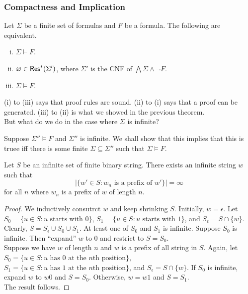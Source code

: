 \subsubsection{Compactness and Implication}

Let $\Sigma$ be a finite set of formulas and $F$ be a formula. The following are equivalent.
\begin{enumerate}[(i)]
	\item $\Sigma\vdash F$.
	\item $\varnothing\in\mathsf{Res}^*(\Sigma')$, where $\Sigma'$ is the CNF of $\bigwedge\Sigma\land\neg F$.
	\item $\Sigma\vDash F$.
\end{enumerate}

(i) to (iii) says that proof rules are sound. (ii) to (i) says that a proof can be generated. (iii) to (ii) is what we showed in the previous theorem.\\

But what do we do in the case where $\Sigma$ is infinite?

Suppose $\Sigma''\vDash F$ and $\Sigma''$ is infinite. We shall show that this implies that this is truee iff there is some finite $\Sigma\subseteq\Sigma''$ such that $\Sigma\vDash F$.\\

\begin{theorem}
	Let $S$ be an infinite set of finite binary string. There exists an infinite string $w$ such that
	\[ |\{w'\in S : w_n \text{ is a prefix of }w'\}|=\infty \]
	for all $n$ where $w_n$ is a prefix of $w$ of length $n$.
\end{theorem}
\begin{proof}
	We inductively consutrct $w$ and keep shrinking $S$. Initially, $w=\epsilon$. Let $S_0=\{u\in S : u\text{ starts with }0\}$, $S_1 = \{u\in S : u \text{ starts with }1\}$, and $S_\epsilon = S \cap \{w\}$. Clearly, $S=S_\epsilon\cup S_0\cup S_1$. At least one of $S_0$ and $S_1$ is infinite. Suppose $S_0$ is infinite. Then ``expand'' $w$ to $0$ and restrict to $S=S_0$.\\
	Suppose we have $w$ of length $n$ and $w$ is a prefix of all string in $S$. Again, let $S_0=\{u\in S : u\text{ has }0\text{ at the $n$th position}\}$, $S_1 = \{u\in S : u \text{ has }1\text{ at the $n$th position}\}$, and $S_\epsilon = S\cap\{w\}$. If $S_0$ is infinite, expand $w$ to $w0$ and $S=S_0$. Otherwise, $w=w1$ and $S=S_1$.\\
	The result follows.
\end{proof}

